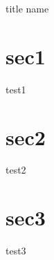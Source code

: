 \documentclass[10pt,a4j,report]{article}
\begin{document}
title
name


\section{sec1}
  test1
\section{sec2}
  test2
\section{sec3}
  test3

  
\end{document}
